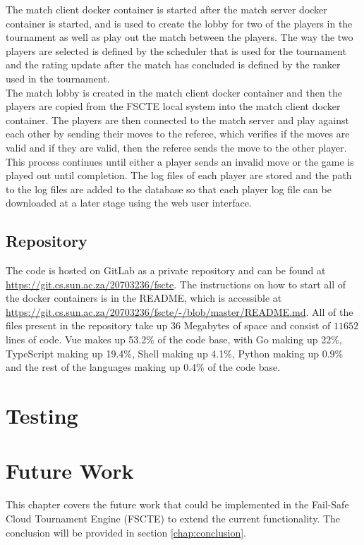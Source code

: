 \documentclass[a4paper, 12pt]{report}
\begin{document}
The match client docker container is started after the match server docker container
is started, and is used to create the lobby for two of the players in the tournament
as well as play out the match between the players. The way the two players are
selected is defined by the scheduler that is used for the tournament and the
rating update after the match has concluded is defined by the ranker used in the
tournament. \\

The match lobby is created in the match client docker container and then the
players are copied from the FSCTE local system into the match client docker
container. The players are then connected to the match server and play against
each other by sending their moves to the referee, which verifies if the moves are
valid and if they are valid, then the referee sends the move to the other player.
This process continues until either a player sends an invalid move or the game
is played out until completion. The log files of each player are stored and the
path to the log files are added to the database so that each player log file can
be downloaded at a later stage using the web user interface.

\section{Repository}

The code is hosted on GitLab as a private repository and can be found at
\url{https://git.cs.sun.ac.za/20703236/fscte}. The instructions on how to start
all of the docker containers is in the README, which is accessible at
\url{https://git.cs.sun.ac.za/20703236/fscte/-/blob/master/README.md}. All of
the files present in the repository take up 36 Megabytes of space and consist
of $11 652$ lines of code. Vue makes up 53.2\% of the code base, with Go making
up 22\%, TypeScript making up 19.4\%, Shell making up 4.1\%, Python making up
0.9\% and the rest of the languages making up 0.4\% of the code base.

\chapter{Testing}
\label{chap:testing}

\chapter{Future Work}
\label{chap:future}

This chapter covers the future work that could be implemented in the Fail-Safe
Cloud Tournament Engine (FSCTE) to extend the current functionality. The
conclusion will be provided in section \ref{chap:conclusion}.
\end{document}
